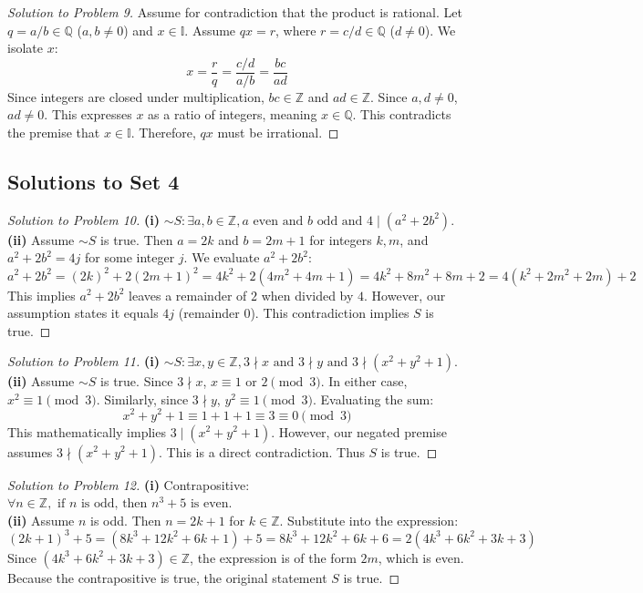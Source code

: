 \documentclass{article}
\begin{document}
\begin{proof}[Solution to Problem 9]
Assume for contradiction that the product is rational. Let $q = a/b \in \mathbb{Q}$ ($a, b \neq 0$) and $x \in \mathbb{I}$. Assume $qx = r$, where $r = c/d \in \mathbb{Q}$ ($d \neq 0$). We isolate $x$:
\[ x = \frac{r}{q} = \frac{c/d}{a/b} = \frac{bc}{ad} \]
Since integers are closed under multiplication, $bc \in \mathbb{Z}$ and $ad \in \mathbb{Z}$. Since $a, d \neq 0$, $ad \neq 0$. This expresses $x$ as a ratio of integers, meaning $x \in \mathbb{Q}$. This contradicts the premise that $x \in \mathbb{I}$. Therefore, $qx$ must be irrational.
\end{proof}

\subsection{Solutions to Set 4}
\begin{proof}[Solution to Problem 10]
\textbf{(i)} $\sim S: \exists a, b \in \mathbb{Z}, a \text{ even and } b \text{ odd and } 4 \mid (a^2+2b^2)$. \\
\textbf{(ii)} Assume $\sim S$ is true. Then $a=2k$ and $b=2m+1$ for integers $k,m$, and $a^2+2b^2 = 4j$ for some integer $j$. We evaluate $a^2+2b^2$:
\[ a^2+2b^2 = (2k)^2 + 2(2m+1)^2 = 4k^2 + 2(4m^2+4m+1) = 4k^2 + 8m^2 + 8m + 2 = 4(k^2 + 2m^2 + 2m) + 2 \]
This implies $a^2+2b^2$ leaves a remainder of $2$ when divided by $4$. However, our assumption states it equals $4j$ (remainder $0$). This contradiction implies $S$ is true.
\end{proof}

\begin{proof}[Solution to Problem 11]
\textbf{(i)} $\sim S: \exists x,y \in \mathbb{Z}, 3 \nmid x \text{ and } 3 \nmid y \text{ and } 3 \nmid (x^2+y^2+1)$. \\
\textbf{(ii)} Assume $\sim S$ is true. Since $3 \nmid x$, $x \equiv 1 \text{ or } 2 \pmod 3$. In either case, $x^2 \equiv 1 \pmod 3$. Similarly, since $3 \nmid y$, $y^2 \equiv 1 \pmod 3$. 
Evaluating the sum:
\[ x^2 + y^2 + 1 \equiv 1 + 1 + 1 \equiv 3 \equiv 0 \pmod 3 \]
This mathematically implies $3 \mid (x^2+y^2+1)$. However, our negated premise assumes $3 \nmid (x^2+y^2+1)$. This is a direct contradiction. Thus $S$ is true.
\end{proof}

\begin{proof}[Solution to Problem 12]
\textbf{(i)} Contrapositive: $\forall n \in \mathbb{Z}, \text{ if } n \text{ is odd, then } n^3 + 5 \text{ is even}$. \\
\textbf{(ii)} Assume $n$ is odd. Then $n = 2k+1$ for $k \in \mathbb{Z}$. Substitute into the expression:
\[ (2k+1)^3 + 5 = (8k^3 + 12k^2 + 6k + 1) + 5 = 8k^3 + 12k^2 + 6k + 6 = 2(4k^3 + 6k^2 + 3k + 3) \]
Since $(4k^3 + 6k^2 + 3k + 3) \in \mathbb{Z}$, the expression is of the form $2m$, which is even. Because the contrapositive is true, the original statement $S$ is true.
\end{proof}
\end{document}
